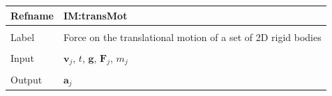 \documentclass[12pt]{article}
\begin{document}
\vspace{\baselineskip}
\noindent
\begin{minipage}{\textwidth}
\begin{tabular}{>{\raggedright}p{}>{\raggedright\arraybackslash}p{}}
\toprule \textbf{Refname} & \textbf{IM:transMot}
\label{IM:transMot}
\\ \midrule \\
Label & Force on the translational motion of a set of 2D rigid bodies
        
\\ \midrule \\
Input & ${\mathbf{v}_{j}}$, $t$, $\mathbf{g}$, ${\mathbf{F}_{j}}$, ${m_{j}}$
        
\\ \midrule \\
Output & ${\mathbf{a}_{j}}$
         

\end{tabular}
\end{minipage}
\end{document}
